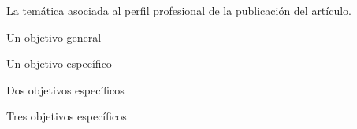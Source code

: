 
\begin{tematica_asociada}
    La temática asociada al perfil profesional de la publicación del artículo.
\end{tematica_asociada}

\begin{objetivo_general}
    Un objetivo general
\end{objetivo_general}

\begin{objetivos_especificos}
    \item Un objetivo específico
    \item Dos objetivos específicos
    \item Tres objetivos específicos
\end{objetivos_especificos}

\begin{plan_de_trabajo}
    \lipsum[1-5]
\end{plan_de_trabajo}

\begin{cronograma}
\end{cronograma}